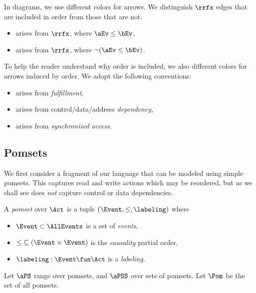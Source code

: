 In diagrams, we use different colors for arrows.  We distinguish
$\rrfx$ edges that are included in order from those that are not.
\begin{itemize}
\item \makebox{$\aEv\xrf\bEv$} arises from $\rrfx$, where $\aEv\le\bEv$,
\item \makebox{$\aEv\xrfint\bEv$} arises from $\rrfx$, where $\lnot(\aEv\le\bEv)$.
\end{itemize}
To help the reader understand why order is included, we also different colors
for arrows induced by order.  We adopt the following conventions:
\begin{itemize}  
\item \makebox{$\aEv\xwk\bEv$} arises from \emph{fulfillment},
\item \makebox{$\aEv\xpo\bEv$} arises from control/data/address \emph{dependency},
\item \makebox{$\aEv\xsync\bEv$} arises from \emph{synchronized access}.
\end{itemize}


\subsection{Pomsets}
\label{sec:pomsets}

We first consider a fragment of our language that can be modeled using simple
pomsets.  This captures read and write actions which may be reordered,
but as we shall see does \emph{not} capture control or data dependencies.

\begin{definition}
  \label{def:pomsets}
  A \emph{pomset} over $\Act$ is a tuple
  $(\Event, {\le}, \labeling)$ where
  \begin{itemize}
  \item $\Event\subset\AllEvents$ is a set of \emph{events},
  \item
    ${\le} \subseteq (\Event\times\Event)$ is the \emph{causality} partial order, 
  \item
    $\labeling: \Event \fun \Act$ is a \emph{labeling}.
  \end{itemize}
\end{definition}
Let $\aPS$ range over pomsets, and $\aPSS$ over sets of pomsets.  Let $\Pom$
be the set of all pomsets.

